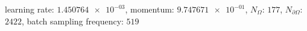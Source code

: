 learning rate: $\num[scientific-notation=true]{1.450764e-03}$, momentum: $\num[scientific-notation=true]{9.747671e-01}$, $N_{\Omega}$: $\num[scientific-notation=false]{177}$, $N_{\partial\Omega}$: $\num[scientific-notation=false]{2422}$, batch sampling frequency: $\num[scientific-notation=false]{519}$